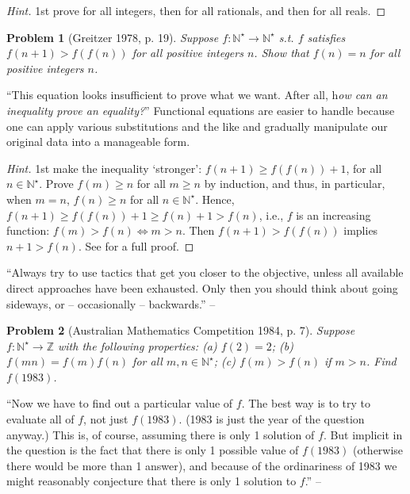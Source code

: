 \documentclass[oneside]{book}
\numberwithin{equation}{section}
\newtheorem{problem}{Problem}[section]
\begin{document}
\begin{proof}[Hint]
	1st prove for all integers, then for all rationals, and then for all reals.
\end{proof}

\begin{problem}[Greitzer 1978, p. 19]
	Suppose $f:\mathbb{N}^\star\to\mathbb{N}^\star$ s.t. $f$ satisfies $f(n + 1) > f(f(n))$ for all positive integers $n$. Show that $f(n) = n$ for all positive integers $n$.
\end{problem}
``This equation looks insufficient to prove what we want. After all, h\textit{ow can an inequality prove an equality?}'' Functional equations are easier to handle because one can apply various substitutions and the like and gradually manipulate our original data into a manageable form.

\begin{proof}[Hint]
	1st make the inequality `stronger': $f(n + 1)\ge f(f(n)) + 1$, for all $n\in\mathbb{N}^\star$. Prove $f(m)\ge n$ for all $m\ge n$ by induction, and thus, in particular, when $m = n$, $f(n)\ge n$ for all $n\in\mathbb{N}^\star$. Hence, $f(n + 1)\ge f(f(n)) + 1\ge f(n) + 1 > f(n)$, i.e., $f$ is an increasing function: $f(m) > f(n)\Leftrightarrow m > n$. Then $f(n + 1) > f(f(n))$ implies $n + 1 > f(n)$. See \cite[pp. 36--38]{Tao2006} for a full proof.
\end{proof}
``Always try to use tactics that get you closer to the objective, unless all available direct approaches have been exhausted. Only then you should think about going sideways, or -- occasionally -- backwards.'' -- \cite[p. 37]{Tao2006}

\begin{problem}[Australian Mathematics Competition 1984, p. 7]
	\label{prob: Australian Mathematics Competition 1984, p. 7}
	Suppose $f:\mathbb{N}^\star\to\mathbb{Z}$ with the following properties: (a) $f(2) = 2$; (b) $f(mn) = f(m)f(n)$ for all $m,n\in\mathbb{N}^\star$; (c) $f(m) > f(n)$ if $m > n$. Find $f(1983)$.
\end{problem}
``Now we have to find out a particular value of $f$. The best way is to try to evaluate all of $f$, not just $f(1983)$. (1983 is just the year of the question anyway.) This is, of course, assuming there is only 1 solution of $f$. But implicit in the question is the fact that there is only 1 possible value of $f(1983)$ (otherwise there would be more than 1 answer), and because of the ordinariness of 1983 we might reasonably conjecture that there is only 1 solution to $f$.'' -- \cite[p. 39]{Tao2006}
\end{document}

